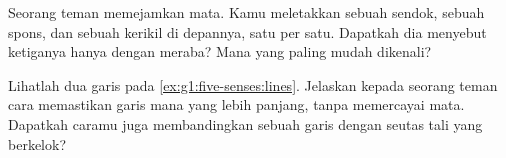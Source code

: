 \begin{exercise}[$\star$]\label{exo:g1:five-senses:8}
Seorang teman memejamkan mata. Kamu meletakkan sebuah sendok, sebuah
spons, dan sebuah kerikil di depannya, satu per satu. Dapatkah dia
menyebut ketiganya hanya dengan meraba? Mana yang paling mudah
dikenali?
\end{exercise}

\begin{exercise}[$\star\star$]\label{exo:g1:five-senses:9}
Lihatlah dua garis pada \cref{ex:g1:five-senses:lines}. Jelaskan
kepada seorang teman cara memastikan garis mana yang lebih panjang,
tanpa memercayai mata. Dapatkah caramu juga membandingkan sebuah garis
dengan seutas tali yang berkelok?
\end{exercise}
